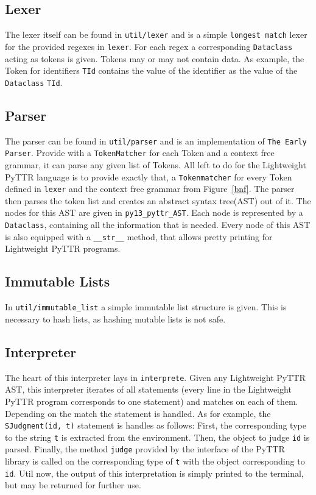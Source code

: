 \documentclass[11pt]{article}
\begin{document}
\subsection{Lexer}

The lexer itself can be found in \texttt{util/lexer} and is a simple \texttt{longest match} lexer for the provided regexes in \texttt{lexer}. For each regex a corresponding \texttt{Dataclass} acting as tokens is given. Tokens may or may not contain data. As example, the Token for identifiers \texttt{TId} contains the value of the identifier as the value of the \texttt{Dataclass} \texttt{TId}.

\subsection{Parser}

The parser can be found in \texttt{util/parser} and is an implementation of \texttt{The Early Parser}.
Provide with a \texttt{TokenMatcher} for each Token and a context free grammar, it can parse any given list of Tokens. All left to do for the Lightweight PyTTR language is to provide exactly that, a \texttt{Tokenmatcher} for every Token defined in \texttt{lexer} and the context free grammar from Figure~\ref{bnf}.
The parser then parses the token list and creates an abstract syntax tree(AST) out of it. The nodes for this AST are given in \texttt{py13\_pyttr\_AST}. Each node is represented by a \texttt{Dataclass}, containing all the information that is needed. Every node of this AST is also equipped with a \texttt{\_\_str\_\_} method, that allows pretty printing for Lightweight PyTTR programs.

\subsection{Immutable Lists}

In \texttt{util/immutable\_list} a simple immutable list structure is given. This is necessary to hash lists, as hashing mutable lists is not safe.

\subsection{Interpreter}

The heart of this interpreter lays in \texttt{interprete}. Given any Lightweight PyTTR AST, this interpreter iterates of all statements (every line in the Lightweight PyTTR program corresponds to one statement) and matches on each of them. Depending on the match the statement is handled. As for example, the \texttt{SJudgment(id, t)} statement is handles as follows: First, the corresponding type to the string \texttt{t} is extracted from the environment. Then, the object to judge \texttt{id} is parsed. Finally, the method \texttt{judge} provided by the interface of the PyTTR library is called on the corresponding type of \texttt{t} with the object corresponding to \texttt{id}. Util now, the output of this interpretation is simply printed to the terminal, but may be returned for further use.
\end{document}
